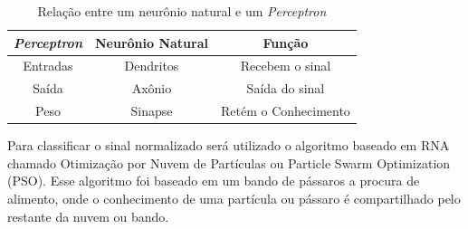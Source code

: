 \documentclass[conference]{IEEEtran}
\begin{document}
\renewcommand\tablename{TABELA}
\begin{table}[!h]
	\renewcommand{\arraystretch}{1.3}
	\caption{Relação entre um neurônio natural e um \textit{Perceptron}}
	\label{table:tabelaComparativaNeuronioPerceptron}
	\centering
	\begin{tabular}{|c|c|c|}
		\hline
		\textbf{\textit{Perceptron}} & \textbf{Neurônio Natural} & \textbf{Função}\\
		\hline
		Entradas & Dendritos & Recebem o sinal \\		
		\hline
		Saída & Axônio & Saída do sinal \\		
		\hline
		Peso & Sinapse & Retém o Conhecimento \\		
		\hline
	\end{tabular}
\end{table}

 
Para classificar o sinal normalizado será utilizado o algoritmo baseado em RNA chamado Otimização por Nuvem de Partículas ou Particle Swarm Optimization (PSO). Esse algoritmo foi baseado em um bando de pássaros a procura de alimento, onde o conhecimento de uma partícula ou pássaro é compartilhado pelo restante da nuvem ou bando.

%
%
\end{document}
